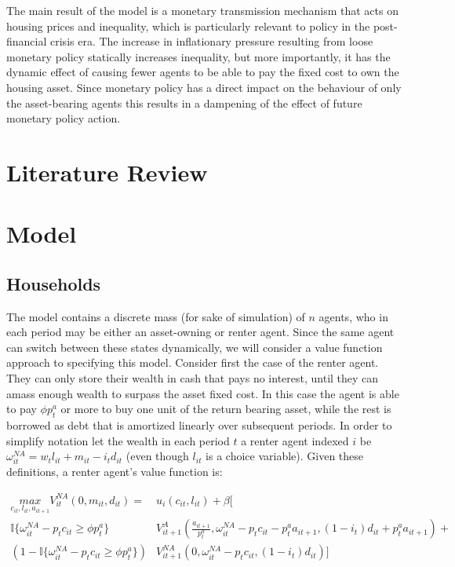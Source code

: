 \documentclass{article}
\begin{document}
The main result of the model is a monetary transmission mechanism that acts on housing prices and inequality, which is particularly relevant to policy in the post-financial crisis era. The increase in inflationary pressure resulting from loose monetary policy statically increases inequality, but more importantly, it has the dynamic effect of causing fewer agents to be able to pay the fixed cost to own the housing asset. Since monetary policy has a direct impact on the behaviour of only the asset-bearing agents this results in a dampening of the effect of future monetary policy action.

\section{Literature Review} \label{lit_review}

\section{Model} \label{model}

\subsection{Households} \label{households}

The model contains a discrete mass (for sake of simulation) of $n$ agents, who in each period may be either an asset-owning or renter agent. Since the same agent can switch between these states dynamically, we will consider a value function approach to specifying this model. Consider first the case of the renter agent. They can only store their wealth in cash that pays no interest, until they can amass enough wealth to surpass the asset fixed cost. In this case the agent is able to pay $\phi p^a_t$ or more to buy one unit of the return bearing asset, while the rest is borrowed as debt that is amortized linearly over subsequent periods. In order to simplify notation let the wealth in each period $t$ a renter agent indexed $i$ be $\omega^{NA}_{it} = w_t l_{it} + m_{it} - i_t d_{it}$ (even though $l_{it}$ is a choice variable). Given these definitions, a renter agent's value function is:

\begin{align}
  \underset{c_{it}, l_{it}, a_{it+1}}{max} V^{NA}_{it}(0, m_{it}, d_{it}) = &u_{i}(c_{it}, l_{it}) + \beta [ \nonumber \\ 
  \mathbb{I}\{\omega^{NA}_{it} - p_t c_{it} \geq \phi p_t^a \} &V^A_{it+1}(\frac{a_{it+1}}{p^a_t}, \omega^{NA}_{it} - p_t c_{it} - p^a_t a_{it+1}, (1 - i_t) d_{it} + p^a_t a_{it+1}) + \nonumber \\ 
  \left(1 - \mathbb{I}\{\omega^{NA}_{it} - p_t c_{it} \geq \phi p_t^a \} \right) &V^{NA}_{it+1}(0, \omega^{NA}_{it} - p_t c_{it}, (1 - i_t) d_{it})] \label{vna}
\end{align}
\end{document}
